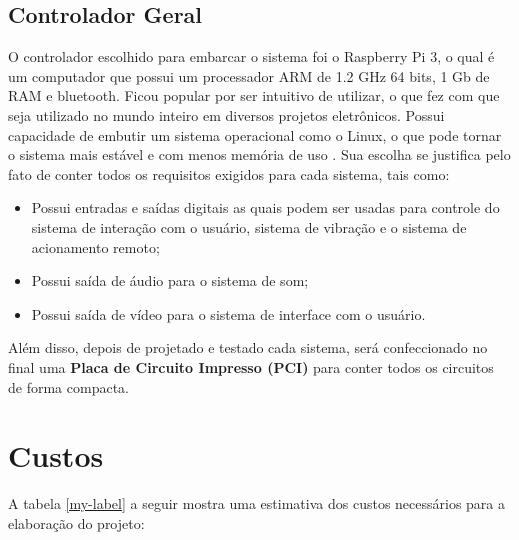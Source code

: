 \documentclass[conference]{IEEEtran}
\begin{document}
\subsection{\textbf{Controlador Geral}}
O controlador escolhido para embarcar o sistema foi o Raspberry Pi 3, o qual é um computador que possui um processador ARM de 1.2 GHz 64 bits, 1 Gb de RAM e bluetooth. Ficou popular por ser intuitivo de utilizar, o que fez com que seja utilizado no mundo inteiro em diversos projetos eletrônicos. Possui capacidade de embutir um sistema operacional como o Linux, o que pode tornar o sistema mais estável e com menos memória de uso \cite{mq3}. Sua escolha se justifica pelo fato de conter todos os requisitos exigidos para cada sistema, tais como:

\begin{itemize}
  \item Possui entradas e saídas digitais as quais podem ser usadas para controle do sistema de interação com o usuário, sistema de vibração e o sistema de acionamento remoto;
  \item Possui saída de áudio para o sistema de som;
  \item Possui saída de vídeo para o sistema de interface com o usuário.
\end{itemize}

Além disso, depois de projetado e testado cada sistema, será confeccionado no final uma \textbf{Placa de Circuito Impresso (PCI)} para conter todos os circuitos de forma compacta.


\section{Custos}

A tabela \ref{my-label} a seguir mostra uma estimativa dos custos necessários para a elaboração do projeto:
\end{document}
